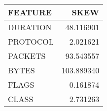 \begin{tabular}{lr}
\toprule
 FEATURE &       SKEW \\
\midrule
DURATION &  48.116901 \\
PROTOCOL &   2.021621 \\
 PACKETS &  93.543557 \\
   BYTES & 103.889340 \\
   FLAGS &   0.161874 \\
   CLASS &   2.731263 \\
\bottomrule
\end{tabular}
